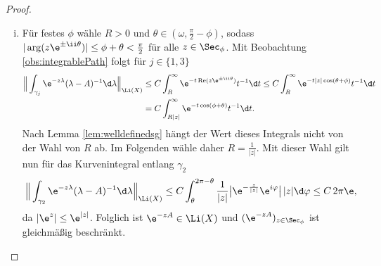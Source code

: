\begin{proof}
  \begin{enumerate}[(i)]
    \item Für festes $\phi$ wähle $R > 0$ und $\theta \in (\omega, \frac{\pi}{2} - \phi)$, sodass  $|\arg(z \e^{\pm \ii\theta})| \leq \phi + \theta < \frac{\pi}{2}$ für alle $z \in \Sec_\phi$.
      Mit Beobachtung \ref{obs:integrablePath} folgt für $j \in \{1,3\}$
      \begin{align*}
        \Big\| \int_{\gamma_{j}} \e^{-z \lambda} (\lambda - A)^{-1} \d \lambda \Big\|_{\Li(X)} 
        &\leq C\int_R^\infty \e^{-t \operatorname{Re}(z \e^{\pm \ii\theta})} t^{-1} \d t
        \leq C \int_R^\infty \e^{-t |z| \cos(\theta + \phi)} t^{-1} \d t \\
        &= C \int_{R|z|}^\infty \e^{-t \cos(\phi+\theta)} t^{-1} \d t.
      \end{align*}
      Nach Lemma \ref{lem:welldefinedsg} hängt der Wert dieses Integrals nicht von der Wahl von $R$ ab. 
      Im Folgenden wähle daher $R = \frac{1}{|z|}$.
      Mit dieser Wahl gilt nun für das Kurvenintegral entlang $\gamma_2$
      \begin{align*}
        \Big\|\int_{\gamma_2} \e^{-z \lambda} (\lambda - A)^{-1} \d \lambda \Big\|_{\Li(X)}
        \leq C\int_\theta^{2\pi - \theta} \frac{1}{|z|} \big|\e^{-\frac{z}{|z|}} \e^{i \varphi} \big| \, |z| \d \varphi
        \leq C \, 2\pi \e,
      \end{align*}
      da $|\e^z| \leq \e^{|z|}$.
      Folglich ist $\e^{-z A} \in \Li(X)$ und $(\e^{-zA})_{z \in \Sec_\phi}$ ist gleichmäßig beschränkt.


\end{enumerate}
\end{proof}
